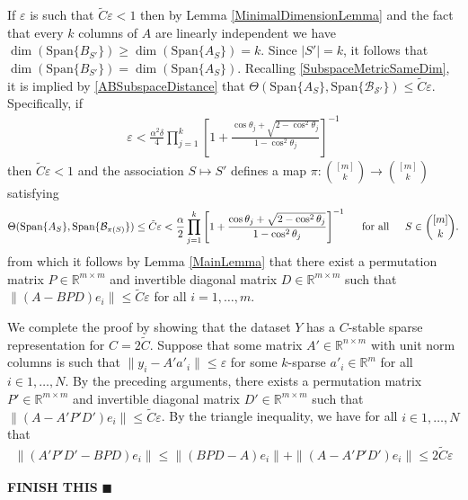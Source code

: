 \documentclass[journal,onecolumn]{IEEEtran}
\begin{document}
If $\varepsilon$ is such that $\tilde C\varepsilon < 1$ then by Lemma \ref{MinimalDimensionLemma} and the fact that every $k$ columns of $A$ are linearly independent we have $\dim(\text{Span}\{B_{S'}\}) \geq \dim(\text{Span}\{A_S\}) = k$. Since $|S'| = k$, it follows that $\dim(\text{Span}\{B_{S'}\}) = \dim(\text{Span}\{A_S\})$. Recalling \eqref{SubspaceMetricSameDim}, it is implied by \eqref{ABSubspaceDistance} that $\Theta(\text{Span}\{A_S\}, \text{Span}\{\mathcal{B_{S'}}\}) \leq \tilde C\varepsilon$. Specifically, if
\begin{align}
\varepsilon < \frac{\alpha^2\delta}{4} \prod_{j=1}^k \left[ 1 + \frac{\cos\theta_j + \sqrt{2 - \cos^2\theta_j}}{1 - \cos^2\theta_j} \right]^{-1}
\end{align}
%
then $\tilde C\varepsilon < 1$ and the association $S \mapsto S'$ defines a map $\pi: {[m] \choose k} \to {[m] \choose k}$ satisfying 
\begin{align}
\Theta(\text{Span}\{A_S\}, \text{Span}\{\mathcal{B}_{\pi(S)}\}) \leq \tilde C\varepsilon < \frac{\alpha}{2} \prod_{j=1}^k \left[ 1 + \frac{\cos\theta_j + \sqrt{2 - \cos^2\theta_j}}{1 - \cos^2\theta_j} \right]^{-1}
\indent \text{for all} \indent S \in {[m] \choose k}.
\end{align}
%
from which it follows by Lemma \ref{MainLemma} that there exist a permutation matrix $P \in \mathbb{R}^{m \times m}$ and invertible diagonal matrix $D \in \mathbb{R}^{m \times m}$ such that $\|(A - BPD)e_i\| \leq \tilde C \varepsilon$ for all $i = 1, \ldots, m$. 

We complete the proof by showing that the dataset $Y$ has a $C$-stable sparse representation for $C = 2\tilde C$. Suppose that some matrix $A' \in \mathbb{R}^{n \times m}$ with unit norm columns is such that $\|y_i - A'a'_i\| \leq \varepsilon$ for some $k$-sparse $a'_i \in \mathbb{R}^m$ for all $i \in 1, \ldots, N$. By the preceding arguments, there exists a permutation matrix $P' \in \mathbb{R}^{m \times m}$ and invertible diagonal matrix $D' \in \mathbb{R}^{m \times m}$ such that $\|(A - A'P'D')e_i\| \leq \tilde C \varepsilon$. By the triangle inequality, we have for all $i \in 1, \ldots, N$ that
\begin{align}
\|(A'P'D' - BPD)e_i\| \leq \|(BPD - A)e_i\| + \|(A- A'P'D')e_i\| \leq 2\tilde C \varepsilon
\end{align}

\textbf{FINISH THIS} \indent $\blacksquare$

\end{document}
